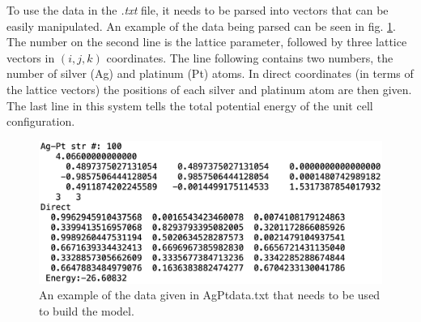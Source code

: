 \par To use the data in the \textit{.txt} file, it needs to be parsed into vectors that can be easily manipulated. An example of the data being parsed can be seen in fig. \ref{system2data}. The number on the second line is the lattice parameter, followed by three lattice vectors in $(i,j,k)$ coordinates. The line following contains two numbers, the number of silver (Ag) and platinum (Pt) atoms. In direct coordinates (in terms of the lattice vectors) the positions of each silver and platinum atom are then given. The last line in this system tells the total potential energy of the unit cell configuration. 

\begin{figure}%
\centering
\includegraphics[scale = 0.4]{Figures/system2}
\caption{An example of the data given in AgPtdata.txt that needs to be used to build the model.
\label{system2data}} 
\end{figure}

